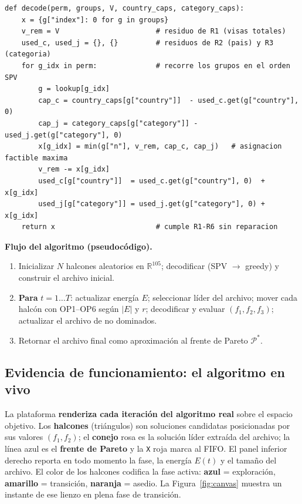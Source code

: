 \documentclass[11pt,letterpaper]{article}
\begin{document}
\begin{lstlisting}[style=vp,caption={Decodificador greedy: factibilidad garantizada por construcción.},label={lst:decoder}]
def decode(perm, groups, V, country_caps, category_caps):
    x = {g["index"]: 0 for g in groups}
    v_rem = V                       # residuo de R1 (visas totales)
    used_c, used_j = {}, {}         # residuos de R2 (pais) y R3 (categoria)
    for g_idx in perm:              # recorre los grupos en el orden SPV
        g = lookup[g_idx]
        cap_c = country_caps[g["country"]]  - used_c.get(g["country"], 0)
        cap_j = category_caps[g["category"]] - used_j.get(g["category"], 0)
        x[g_idx] = min(g["n"], v_rem, cap_c, cap_j)   # asignacion factible maxima
        v_rem -= x[g_idx]
        used_c[g["country"]]  = used_c.get(g["country"], 0)  + x[g_idx]
        used_j[g["category"]] = used_j.get(g["category"], 0) + x[g_idx]
    return x                        # cumple R1-R6 sin reparacion
\end{lstlisting}

\begin{resultbox}
\textbf{Flujo del algoritmo (pseudocódigo).}
\begin{enumerate}\setlength{\itemsep}{1pt}
    \item Inicializar $N$ halcones aleatorios en $\mathbb{R}^{105}$; decodificar (SPV $\to$ greedy) y construir el archivo inicial.
    \item \textbf{Para} $t=1\dots T$: actualizar energía $E$; seleccionar líder del archivo; mover cada halcón con OP1--OP6 según $|E|$ y $r$; decodificar y evaluar $(f_1,f_2,f_3)$; actualizar el archivo de no dominados.
    \item Retornar el archivo final como aproximación al frente de Pareto $\mathcal{P}^*$.
\end{enumerate}
\end{resultbox}

\subsection{Evidencia de funcionamiento: el algoritmo en vivo}
La plataforma \textbf{renderiza cada iteración del algoritmo real} sobre el espacio objetivo. Los \textbf{halcones} (triángulos) son soluciones candidatas posicionadas por sus valores $(f_1,f_2)$; el \textbf{conejo} rosa es la solución líder extraída del archivo; la línea azul es el \textbf{frente de Pareto} y la \texttt{X} roja marca al FIFO. El panel inferior derecho reporta en todo momento la fase, la energía $E(t)$ y el tamaño del archivo. El color de los halcones codifica la fase activa: \textcolor{blue!70!black}{\textbf{azul}} = exploración, \textcolor{orange!80!black}{\textbf{amarillo}} = transición, \textcolor{red!70!black}{\textbf{naranja}} = asedio. La Figura~\ref{fig:canvas} muestra un instante de ese lienzo en plena fase de transición.
\end{document}
